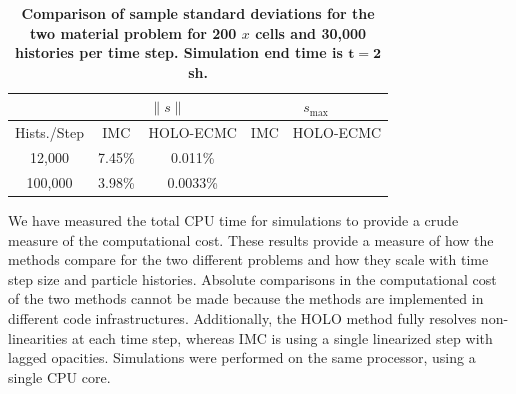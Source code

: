 \documentclass{mc2013}
\renewcommand{\ss}{\ensuremath{\|s\|}}
\begin{document}
\begin{table}[H]
\centering
\caption{\label{twomat_var} \textbf{Comparison of sample standard deviations for the
    two material problem for 200 $x$ cells and 30,000 histories per time step.   Simulation end time is $\mathbf{t=2}$ sh.}}
\vspace{-0.1in}
\begin{tabular}{|c|cc|cc|}\cline{2-5}
    \multicolumn{1}{c|}{}       & \multicolumn{2}{|c|}{\ss} & \multicolumn{2}{|c|}{$s_{\max}$} \\ \hline
Hists./Step     & IMC & HOLO-ECMC  &  IMC & HOLO-ECMC   \\ \hline
   12,000	    & 7.45\%  & 0.011\% &     &              \\
  100,000       & 3.98\%  & 0.0033\% &    &       \\ \hline
\end{tabular}
\end{table}

\label{timing}

We have measured the total CPU time for simulations to provide a crude measure of the
computational cost.  These results provide a measure of how the methods compare for
the two different problems and how they scale with
time step size and particle histories.  Absolute comparisons in the computational cost of the two
methods cannot be made because the methods are implemented
in different code infrastructures. Additionally, the HOLO method fully resolves
non-linearities at each time step, whereas IMC is using a single linearized step with
lagged opacities. Simulations were performed on the same processor, using a single CPU
core.
\end{document}
